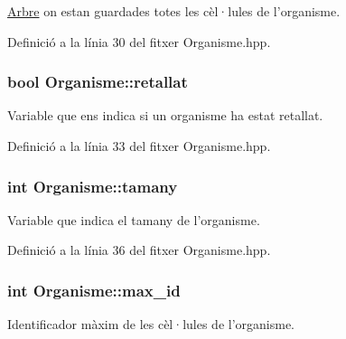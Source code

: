 \hyperlink{class_arbre}{Arbre} on estan guardades totes les cèl·lules de l'organisme. 



Definició a la línia 30 del fitxer Organisme.\-hpp.

\hypertarget{class_organisme_acf912225a83570cb68542dcc6709023a}{
\subsubsection[{retallat}]{\setlength{\rightskip}{0pt plus 5cm}bool Organisme\-::retallat\hspace{0.3cm}{\ttfamily [private]}}}\label{class_organisme_acf912225a83570cb68542dcc6709023a}


Variable que ens indica si un organisme ha estat retallat. 



Definició a la línia 33 del fitxer Organisme.\-hpp.

\hypertarget{class_organisme_a5d30992b5ded1a9314aff94ce9fb3932}{
\subsubsection[{tamany}]{\setlength{\rightskip}{0pt plus 5cm}int Organisme\-::tamany\hspace{0.3cm}{\ttfamily [private]}}}\label{class_organisme_a5d30992b5ded1a9314aff94ce9fb3932}


Variable que indica el tamany de l'organisme. 



Definició a la línia 36 del fitxer Organisme.\-hpp.

\hypertarget{class_organisme_ae7f51a74f01cee155cf88a5b01545f78}{
\subsubsection[{max\-\_\-id}]{\setlength{\rightskip}{0pt plus 5cm}int Organisme\-::max\-\_\-id\hspace{0.3cm}{\ttfamily [private]}}}\label{class_organisme_ae7f51a74f01cee155cf88a5b01545f78}


Identificador màxim de les cèl·lules de l'organisme. 



